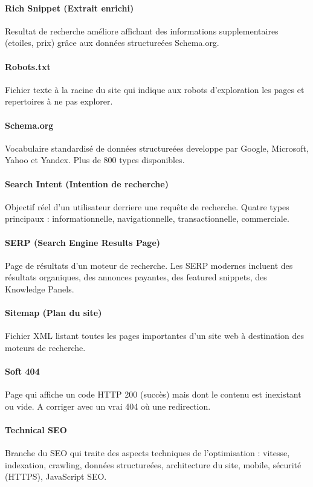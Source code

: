 \documentclass[12pt,a4paper,twoside]{report}
\begin{document}
\paragraph*{Rich Snippet (Extrait enrichi)}
Resultat de recherche améliore affichant des informations supplementaires (etoiles, prix) grâce aux données structureées Schema.org.

\paragraph*{Robots.txt}
Fichier texte à la racine du site qui indique aux robots d'exploration les pages et repertoires à ne pas explorer.

\paragraph*{Schema.org}
Vocabulaire standardisé de données structureées developpe par Google, Microsoft, Yahoo et Yandex. Plus de 800 types disponibles.

\paragraph*{Search Intent (Intention de recherche)}
Objectif réel d'un utilisateur derriere une requête de recherche. Quatre types principaux : informationnelle, navigationnelle, transactionnelle, commerciale.

\paragraph*{SERP (Search Engine Results Page)}
Page de résultats d'un moteur de recherche. Les SERP modernes incluent des résultats organiques, des annonces payantes, des featured snippets, des Knowledge Panels.

\paragraph*{Sitemap (Plan du site)}
Fichier XML listant toutes les pages importantes d'un site web à destination des moteurs de recherche.

\paragraph*{Soft 404}
Page qui affiche un code HTTP 200 (succès) mais dont le contenu est inexistant ou vide. A corriger avec un vrai 404 où une redirection.

\paragraph*{Technical SEO}
Branche du SEO qui traite des aspects techniques de l'optimisation : vitesse, indexation, crawling, données structureées, architecture du site, mobile, sécurité (HTTPS), JavaScript SEO.
\end{document}
